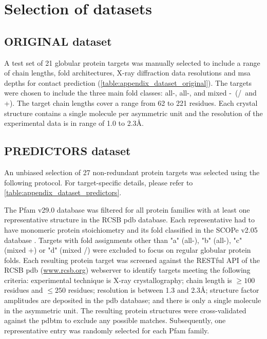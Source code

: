\section{Selection of datasets}
\subsection{ORIGINAL dataset} \label{sec:methods_dataset_original}
A test set of 21 globular protein targets was manually selected to include a range of chain lengths, fold architectures, X-ray diffraction data resolutions and \gls{msa} depths for contact prediction  (\cref{table:appendix_dataset_original}). The targets were chosen to include the three main fold classes: all-\textalpha, all-\textbeta, and mixed \textalpha-\textbeta\ (\textalpha/\textbeta\ and \textalpha+\textbeta). The target chain lengths cover a range from 62 to 221 residues. Each crystal structure contains a single molecule per asymmetric unit and the resolution of the experimental data is in range of 1.0 to 2.3\AA.

\subsection{PREDICTORS dataset} \label{sec:methods_dataset_predictors}
An unbiased selection of 27 non-redundant protein targets was selected using the following protocol. For target-specific details, please refer to \cref{table:appendix_dataset_predictors}.

The Pfam v29.0 \cite{Finn2016-zo} database was filtered for all protein families with at least one representative structure in the RCSB \gls{pdb} \cite{Berman2000-ua} database. Each representative had to have monomeric protein stoichiometry and its fold classified in the SCOPe v2.05 database \cite{Chandonia2017-vf}. Targets with fold assignments other than "a" (all-\textalpha), "b" (all-\textbeta), "c" (mixed \textalpha+\textbeta) or "d" (mixed \textalpha/\textbeta) were excluded to focus on regular globular protein folds. Each resulting protein target was screened against the RESTful API of the RCSB \gls{pdb} (\url{www.rcsb.org}) webserver to identify targets meeting the following criteria: experimental technique is X-ray crystallography; chain length is $\geq100$ residues and $\leq250$ residues; resolution is between 1.3 and 2.3\AA; structure factor amplitudes are deposited in the \gls{pdb} \cite{Berman2000-ua} database; and there is only a single molecule in the asymmetric unit. The resulting protein structures were cross-validated against the \gls{pdbtm} \cite{Tusnady2005-ns} to exclude any possible matches. Subsequently, one representative entry was randomly selected for each Pfam family.

